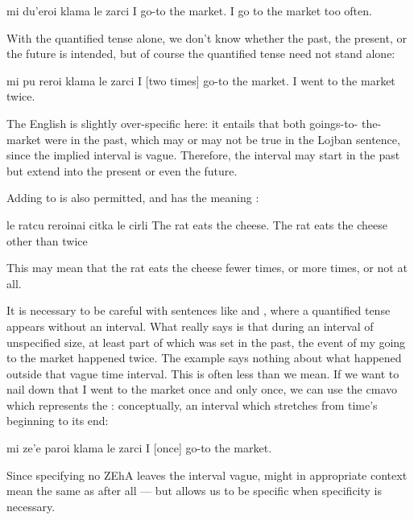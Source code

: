 \begin{example}
mi du'eroi klama le zarci\n
I  go-to the market.\n
I go to the market too often.
\end{example}

With the quantified tense alone, we don't know whether the
    past, the present, or the future is intended, but of course the
    quantified tense need not stand alone:
\begin{example}
mi pu reroi klama le zarci\n
I  [two times] go-to the market.\n
I went to the market twice.
\end{example}

The English is slightly over-specific here: it entails that
    both goings-to- the-market were in the past, which may or may
    not be true in the Lojban sentence, since the implied interval
    is vague. Therefore, the interval may start in the past but
    extend into the present or even the future. 

Adding  to  is also permitted, and has the
    meaning :
\begin{example}
le ratcu reroinai citka le cirli\n
The rat  eats the cheese.\n
The rat eats the cheese other than twice
\end{example}

This may mean that the rat eats the cheese fewer times, or
    more times, or not at all.

It is necessary to be careful with sentences like  and , where a quantified tense appears without an interval.
    What  really says is that during
    an interval of unspecified size, at least part of which was set
    in the past, the event of my going to the market happened
    twice. The example says nothing about what happened outside
    that vague time interval. This is often less than we mean. If
    we want to nail down that I went to the market once and only
    once, we can use the cmavo  which represents the
    : conceptually, an interval which
    stretches from time's beginning to its end:
\begin{example}
mi ze'e paroi klama le zarci\n
I  [once] go-to the market.
\end{example}

Since specifying no ZEhA leaves the interval vague,  might in appropriate context mean
    the same as  after all --- but allows us to be specific when
    specificity is necessary.

